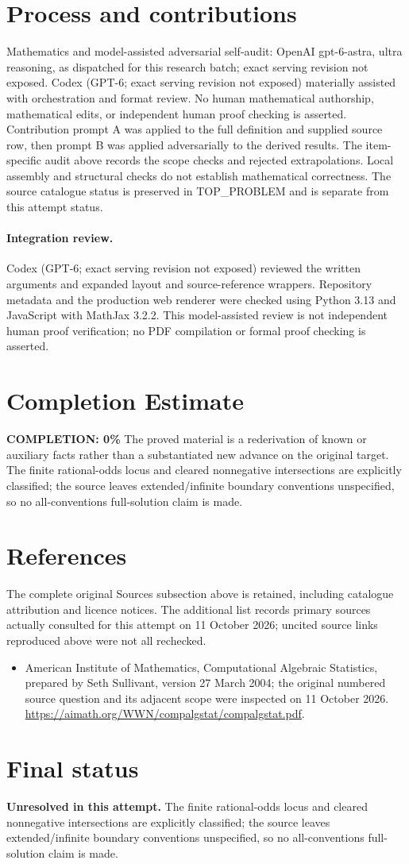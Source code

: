 \documentclass[11pt]{article}
\begin{document}
\section{Process and contributions}
Mathematics and model-assisted adversarial self-audit: OpenAI gpt-6-astra, ultra reasoning, as dispatched for this research batch; exact serving revision not exposed. Codex (GPT-6; exact serving revision not exposed) materially assisted with orchestration and format review. No human mathematical authorship, mathematical edits, or independent human proof checking is asserted.
Contribution prompt A was applied to the full definition and supplied source row, then prompt B was applied adversarially to the derived results. The item-specific audit above records the scope checks and rejected extrapolations. Local assembly and structural checks do not establish mathematical correctness. The source catalogue status is preserved in TOP\_PROBLEM and is separate from this attempt status.
\paragraph{Integration review.} Codex (GPT-6; exact serving revision not exposed) reviewed the written arguments and expanded layout and source-reference wrappers. Repository metadata and the production web renderer were checked using Python 3.13 and JavaScript with MathJax 3.2.2. This model-assisted review is not independent human proof verification; no PDF compilation or formal proof checking is asserted.

\section{Completion Estimate}
\noindent\textbf{COMPLETION: 0\%}
The proved material is a rederivation of known or auxiliary facts rather than a substantiated new advance on the original target. The finite rational-odds locus and cleared nonnegative intersections are explicitly classified; the source leaves extended/infinite boundary conventions unspecified, so no all-conventions full-solution claim is made.
\section{References}
The complete original Sources subsection above is retained, including catalogue attribution and licence notices. The additional list records primary sources actually consulted for this attempt on 11 October 2026; uncited source links reproduced above were not all rechecked.
\begin{itemize}
\item American Institute of Mathematics, Computational Algebraic Statistics, prepared by Seth Sullivant, version 27 March 2004; the original numbered source question and its adjacent scope were inspected on 11 October 2026. \url{https://aimath.org/WWN/compalgstat/compalgstat.pdf}.
\end{itemize}
\section{Final status}
\textbf{Unresolved in this attempt.} The finite rational-odds locus and cleared nonnegative intersections are explicitly classified; the source leaves extended/infinite boundary conventions unspecified, so no all-conventions full-solution claim is made.
\end{document}
